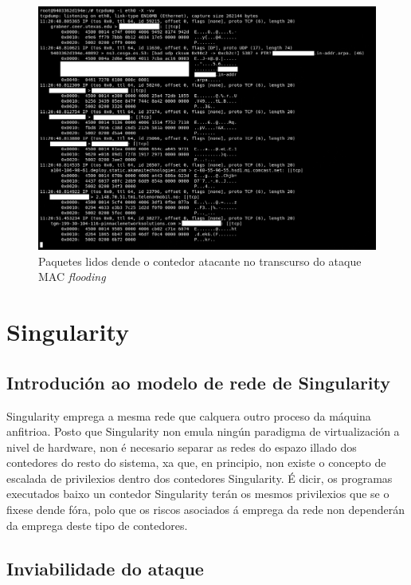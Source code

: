 \begin{enumerate}
\begin{figure}[H]
\centerline{\includegraphics[width=15cm]{figuras/ataqueMacFlooding.png}}
\caption{Paquetes lidos dende o contedor atacante no transcurso do ataque \gls{MAC} \textit{flooding}}
\label{ataqueMacFlooding}
\end{figure}

\end{enumerate}

\section{Singularity}

\subsection{Introdución ao modelo de rede de Singularity}

Singularity emprega a mesma rede que calquera outro proceso da máquina anfitrioa. Posto que Singularity non emula ningún paradigma de virtualización a nivel de hardware, non é necesario separar as redes do espazo illado dos contedores do resto do sistema, xa que, en principio, non existe o concepto de escalada de privilexios dentro dos contedores Singularity. É dicir, os programas executados baixo un contedor Singularity terán os mesmos privilexios que se o fixese dende fóra, polo que os riscos asociados á emprega da rede non dependerán da emprega deste tipo de contedores. \cite{SingularityHPC}

\subsection{Inviabilidade do ataque}

